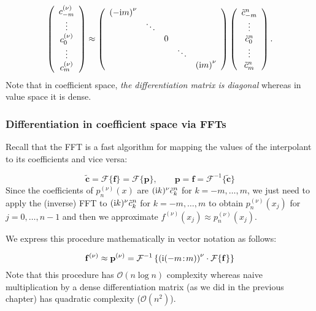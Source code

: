 \documentclass[12pt,a4paper]{article}
\begin{document}
\[
\left(
\begin{array}{c}
c_{-m}^{(\nu)} \\
\vdots \\
c_{0}^{(\nu)} \\
\vdots \\
c_{m}^{(\nu)}
\end{array}
\right) \approx
\left(
\begin{array}{c c c c c}
\left(-{\rm i}m\right)^{\nu} &  &  &  &   \\
   & \ddots &   & &   \\
      &  &  0 & &   \\
         &  &   & \ddots &   \\
   &   & &     & \left({\rm i}m\right)^{\nu}
\end{array}
\right)
\left(
\begin{array}{c}
\tilde{c}^n_{-m} \\
\vdots \\
\tilde{c}^n_{0} \\
\vdots \\
\tilde{c}^n_{m}
\end{array}
\right).
\]
Note that in coefficient space, \emph{the differentiation matrix is diagonal} whereas in value space it is dense.

\subsubsection{Differentiation in coefficient space via FFTs}
Recall that the FFT is a fast algorithm for mapping the values of the interpolant to its coefficients and vice versa:

\[
\tilde{\mathbf{c}} = \mathcal{F}\lbrace \mathbf{f}  \rbrace = \mathcal{F}\lbrace \mathbf{p}  \rbrace, \qquad  \mathbf{p} =  \mathbf{f} = \mathcal{F}^{-1}\lbrace\tilde{\mathbf{c}}\rbrace 
\]
Since the coefficients of $p^{(\nu)}_n(x)$ are $({\rm i} k)^{\nu}\tilde{c}^n_k$ for $k = -m, \ldots, m$, we just need to apply the (inverse) FFT to $({\rm i} k)^{\nu}\tilde{c}^n_k$ for $k = -m, \ldots, m$ to obtain $p^{(\nu)}_n(x_j)$ for $j = 0, \ldots, n-1$ and then we approximate $f^{(\nu)}(x_j) \approx p^{(\nu)}_n(x_j)$.

We express this procedure mathematically in vector notation as follows:

\[
\mathbf{f}^{(\nu)} \approx \mathbf{p}^{(\nu)} = 
\mathcal{F}^{-1}\left\lbrace\left({\rm i}(-m\!:\!m)\right)^{\nu}\cdot\mathcal{F}\lbrace \mathbf{f} \rbrace\right\rbrace
\]
Note that this procedure has $\mathcal{O}(n \log n)$ complexity whereas naive multiplication by a dense differentiation matrix (as we did in the previous chapter) has quadratic complexity ($\mathcal{O}(n^2)$).
\end{document}
